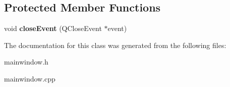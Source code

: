 \subsection*{Protected Member Functions}
\begin{DoxyCompactItemize}
\item 
\hypertarget{class_main_window_a4e20a4a065fbb0e4d3532a45a0a91425}{void {\bfseries close\+Event} (Q\+Close\+Event $\ast$event)}\label{class_main_window_a4e20a4a065fbb0e4d3532a45a0a91425}

\end{DoxyCompactItemize}


The documentation for this class was generated from the following files\+:\begin{DoxyCompactItemize}
\item 
mainwindow.\+h\item 
mainwindow.\+cpp\end{DoxyCompactItemize}
